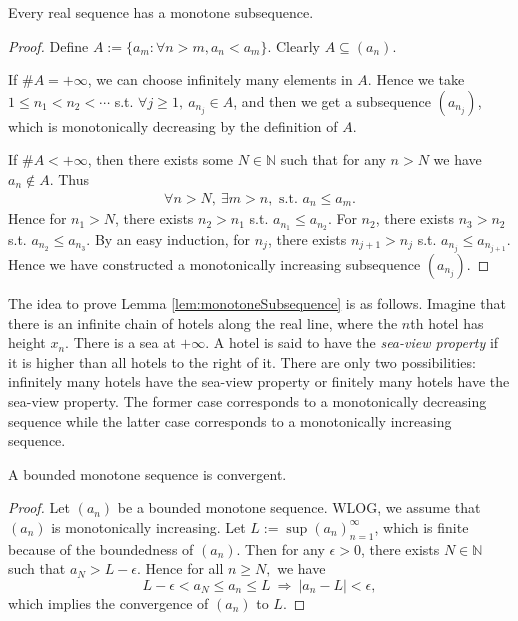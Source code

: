 \begin{lem}
  \label{lem:monotoneSubsequence}
  Every real sequence has a monotone subsequence.
\end{lem}
\begin{proof}
  Define $A:=\{a_{m}: 
  \forall n>m, a_{n}<a_{m}\}$. Clearly $A\subseteq (a_{n})$.

  If $\#A=+\infty$, we can choose infinitely many elements in $A$.
  Hence we take $1\le n_{1}<n_{2}<\cdots$ s.t.
  $\forall j\ge 1,\ a_{n_{j}}\in A$, 
  and then we get a subsequence $(a_{n_{j}})$,
  which is monotonically decreasing by the definition of $A$.

  If $\#A<+\infty$, then there exists some $N\in \mathbb{N}$ such that
  for any $n>N$ we have $a_{n}\notin A$. Thus
  \begin{align*}
    \forall n>N,\ \exists m>n,\text{ s.t. } a_{n}\le a_{m}.
  \end{align*}
  Hence for $n_{1}>N$, there exists $n_{2}>n_{1}$ s.t.
  $a_{n_{1}}\le a_{n_{2}}$. For $n_{2}$, there exists $n_{3}>n_{2}$ s.t.
  $a_{n_{2}}\le a_{n_{3}}$. By an easy induction, for $n_{j}$,
  there exists $n_{j+1}>n_{j}$ s.t. $a_{n_{j}}\le a_{n_{j+1}}$.
  Hence we have constructed a monotonically increasing subsequence
  $(a_{n_{j}})$.
\end{proof}

\begin{rem}
  The idea to prove Lemma \ref{lem:monotoneSubsequence} is as follows.
  Imagine that there is an infinite chain of hotels
  along the real line,
  where the $n$th hotel has height $x_n$.
  There is a sea at $+\infty$.
  A hotel is said to have the \emph{sea-view property}
  if it is higher than all hotels to the right of it.
  There are only two possibilities:
  infinitely many hotels have the sea-view property
  or finitely many hotels have the sea-view property.
  The former case corresponds to a monotonically decreasing sequence
  while
  the latter case corresponds to a monotonically increasing sequence.
\end{rem}

\begin{thm}
  \label{thm:boundedMonotoneSeqIsConvergent}
  A bounded monotone sequence is convergent.
\end{thm}
\begin{proof}
  Let $(a_{n})$ be a bounded monotone sequence.
  WLOG, we assume that $(a_{n})$ is monotonically increasing.
  Let $L:=\sup(a_{n})_{n=1}^{\infty}$, which is finite because of
  the boundedness of $(a_{n})$.
  Then for any $\epsilon>0$, there exists $N\in \mathbb{N}$ such that
  $a_{N}>L-\epsilon$. Hence for all $n\ge N,$ we have
  \begin{displaymath}
    L-\epsilon<a_{N}\le a_{n}\le L\ \Rightarrow\ |a_{n}-L|<\epsilon,
  \end{displaymath}
  which implies the convergence of $(a_{n})$ to $L$.
\end{proof}

